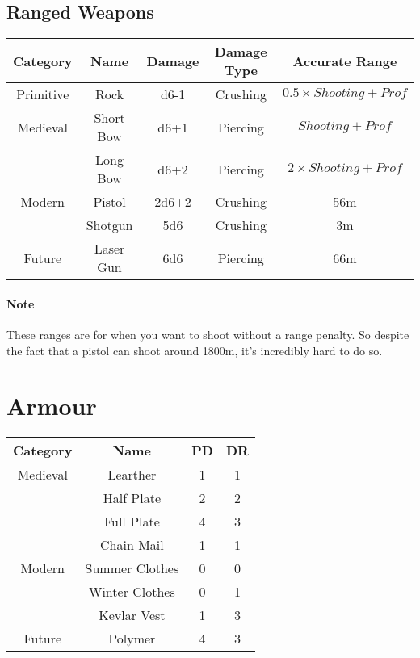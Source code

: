 \subsection{Ranged Weapons}
\begin{center}
\begin{tabular}{c|c|c|c|c}
    \textbf{Category} & \textbf{Name} & \textbf{Damage} & \textbf{Damage Type} & \textbf{Accurate Range} \\\hline
    Primitive & Rock        & d6-1  & Crushing & $0.5 \times Shooting + Prof$  \\\hline
    Medieval  & Short Bow   & d6+1  & Piercing & $Shooting + Prof$ \\
              & Long Bow    & d6+2  & Piercing & $2 \times Shooting + Prof$ \\\hline
    Modern    & Pistol      & 2d6+2 & Crushing & 56m \\
              & Shotgun     & 5d6   & Crushing & 3m \\\hline
    Future    & Laser Gun   & 6d6   & Piercing & 66m \\
\end{tabular}
\end{center}
\paragraph{Note} These ranges are for when you want to shoot without a range penalty.
So despite the fact that a pistol can shoot around 1800m, it's incredibly hard to do so.

\section{Armour}
\begin{center}
\begin{tabular}{c|c|c|c}
\textbf{Category} & \textbf{Name}  & \textbf{PD} & \textbf{DR}\\\hline
         Medieval & Learther       & 1 & 1 \\
                  & Half Plate     & 2 & 2 \\
                  & Full Plate     & 4 & 3 \\
                  & Chain Mail     & 1 & 1 \\\hline
           Modern & Summer Clothes & 0 & 0 \\
                  & Winter Clothes & 0 & 1 \\
                  & Kevlar Vest    & 1 & 3 \\\hline
           Future & Polymer        & 4 & 3 \\
\end{tabular}
\end{center}